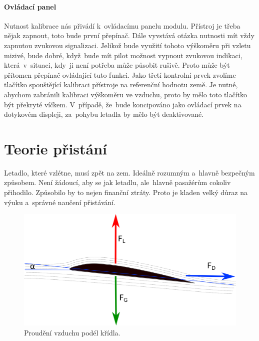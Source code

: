 			\paragraph{Ovládací panel}
				Nutnost kalibrace nás přivádí k~ovládacímu panelu modulu. Přístroj je třeba nějak zapnout, toto bude první přepínač. Dále vyvstává otázka nutnosti mít vždy zapnutou zvukovou signalizaci. Jelikož bude využití tohoto výškoměru při vzletu mizivé, bude dobré, když~bude mít pilot možnost vypnout zvukovou indikaci, která~v~situaci, kdy~ji není potřeba může působit rušivě. Proto může být přítomen přepínač ovládající tuto funkci. Jako třetí kontrolní prvek zvolíme tlačítko spouštějící kalibraci přístroje na referenční hodnotu země. Je nutné, abychom zabránili kalibraci výškoměru ve vzduchu, proto by mělo toto tlačítko být překryté víčkem. V~případě, že~bude koncipováno jako ovládací prvek na dotykovém displeji, za~pohybu letadla by mělo být deaktivované.
				
	\section{Teorie přistání}
		Letadlo, které vzlétne, musí zpět na zem. Ideálně rozumným a~hlavně bezpečným způsobem. Není žádoucí, aby se jak letadlu, ale~hlavně pasažérům cokoliv přihodilo. Způsobilo by to nejen finanční ztráty. Proto je kladen velký důraz na výuku a~správné naučení přistávání.  

		\begin{figure}[H]
			\begin{center}
				\includegraphics[scale=0.7]{obrazky-figures/angle_of_attack.png}
				\caption{Proudění vzduchu podél křídla.}
				\label{teorie::pristani::angle_of_attack}
			\end{center}
		\end{figure}
		
